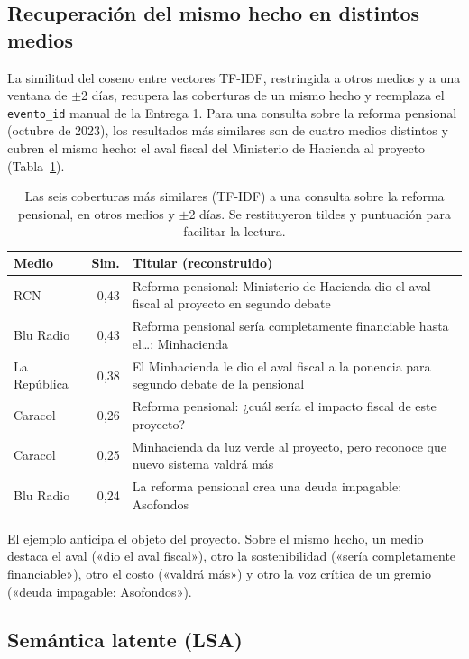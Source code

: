 \documentclass[10pt,twocolumn]{article}
\begin{document}
\subsection{Recuperación del mismo hecho en distintos medios}

La similitud del coseno entre vectores TF-IDF, restringida a otros medios y a
una ventana de $\pm$2 días, recupera las coberturas de un mismo hecho y
reemplaza el \texttt{evento\_id} manual de la Entrega 1. Para una consulta sobre
la reforma pensional (octubre de 2023), los resultados más similares son de
cuatro medios distintos y cubren el mismo hecho: el aval fiscal del Ministerio
de Hacienda al proyecto (Tabla~\ref{tab:mismo}).

\begin{table}[t]
\centering\small
\caption{Las seis coberturas más similares (TF-IDF) a una consulta sobre la
reforma pensional, en otros medios y $\pm$2 días. Se restituyeron tildes y
puntuación para facilitar la lectura.}
\label{tab:mismo}
\begin{tabular}{l r p{4.1cm}}
\toprule
Medio & Sim. & Titular (reconstruido)\\
\midrule
RCN          & 0{,}43 & Reforma pensional: Ministerio de Hacienda dio el aval fiscal al proyecto en segundo debate\\
Blu Radio    & 0{,}43 & Reforma pensional sería completamente financiable hasta el\ldots: Minhacienda\\
La República & 0{,}38 & El Minhacienda le dio el aval fiscal a la ponencia para segundo debate de la pensional\\
Caracol      & 0{,}26 & Reforma pensional: ¿cuál sería el impacto fiscal de este proyecto?\\
Caracol      & 0{,}25 & Minhacienda da luz verde al proyecto, pero reconoce que nuevo sistema valdrá más\\
Blu Radio    & 0{,}24 & La reforma pensional crea una deuda impagable: Asofondos\\
\bottomrule
\end{tabular}
\end{table}

El ejemplo anticipa el objeto del proyecto. Sobre el mismo hecho, un medio
destaca el aval («dio el aval fiscal»), otro la sostenibilidad («sería
completamente financiable»), otro el costo («valdrá más») y otro la voz crítica
de un gremio («deuda impagable: Asofondos»).

\subsection{Semántica latente (LSA)}
\end{document}
